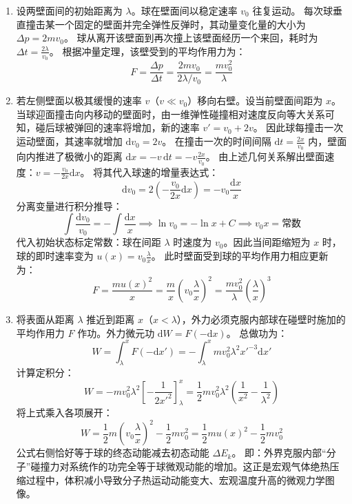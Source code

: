 \begin{solution}
\begin{enumerate}
    \item[(a)] 设两壁面间的初始距离为 $\lambda$。球在壁面间以稳定速率 $v_0$ 往复运动。
    每次球垂直撞击某一个固定的壁面并完全弹性反弹时，其动量变化量的大小为 $\Delta p = 2m v_0$。
    球从离开该壁面到再次撞上该壁面经历一个来回，耗时为 $\Delta t = \frac{2\lambda}{v_0}$。
    根据冲量定理，该壁受到的平均作用力为：
    $$ F = \frac{\Delta p}{\Delta t} = \frac{2mv_0}{2\lambda/v_0} = \frac{m v_0^2}{\lambda} $$
    
    \item[(b)] 若左侧壁面以极其缓慢的速率 $v$（$v \ll v_0$）移向右壁。设当前壁面间距为 $x$。
    当球迎面撞击向内移动的壁面时，由一维弹性碰撞相对速度反向等大关系可知，碰后球被弹回的速率将增加，新的速率 $v' = v_0 + 2v$。
    因此球每撞击一次运动壁面，其速率就增加 $\mathrm{d}v_0 = 2v$。
    在撞击一次的时间间隔 $\mathrm{d}t = \frac{2x}{v_0}$ 内，壁面向内推进了极微小的距离 $\mathrm{d}x = -v \, \mathrm{d}t = -v \frac{2x}{v_0}$。
    由上述几何关系解出壁面速度：$v = -\frac{v_0}{2x} \mathrm{d}x$。
    将其代入球速的增量表达式：
    $$ \mathrm{d}v_0 = 2 \left( -\frac{v_0}{2x} \mathrm{d}x \right) = -v_0 \frac{\mathrm{d}x}{x} $$
    分离变量进行积分推导：
    $$ \int \frac{\mathrm{d}v_0}{v_0} = -\int \frac{\mathrm{d}x}{x} \implies \ln v_0 = -\ln x + C \implies v_0 x = \text{常数} $$
    代入初始状态标定常数：球在间距 $\lambda$ 时速度为 $v_0$。因此当间距缩短为 $x$ 时，球的即时速率变为 $u(x) = v_0 \frac{\lambda}{x}$。
    此时壁面受到球的平均作用力相应更新为：
    $$ F = \frac{m u(x)^2}{x} = \frac{m}{x} \left( v_0 \frac{\lambda}{x} \right)^2 = \frac{m v_0^2}{\lambda} \left( \frac{\lambda}{x} \right)^3 $$

    \item[(c)] 将表面从距离 $\lambda$ 推近到距离 $x$（$x < \lambda$），外力必须克服内部球在碰壁时施加的平均作用力 $F$ 作功。外力微元功 $\mathrm{d}W = F(-\mathrm{d}x)$。
    总做功为：
    $$ W = \int_{\lambda}^{x} F(-\mathrm{d}x') = -\int_{\lambda}^{x} m v_0^2 \lambda^2 x'^{-3} \mathrm{d}x' $$
    计算定积分：
    $$ W = -m v_0^2 \lambda^2 \left[ -\frac{1}{2x'^2} \right]_{\lambda}^{x} = \frac{1}{2} m v_0^2 \lambda^2 \left( \frac{1}{x^2} - \frac{1}{\lambda^2} \right) $$
    将上式乘入各项展开：
    $$ W = \frac{1}{2} m \left( v_0 \frac{\lambda}{x} \right)^2 - \frac{1}{2} m v_0^2 = \frac{1}{2} m u(x)^2 - \frac{1}{2} m v_0^2 $$
    公式右侧恰好等于球的终态动能减去初态动能 $\Delta E_k$。
    即：外界克服内部“分子”碰撞力对系统作的功完全等于球微观动能的增加。这正是宏观气体绝热压缩过程中，体积减小导致分子热运动动能变大、宏观温度升高的微观力学图像。
\end{enumerate}
\end{solution}

